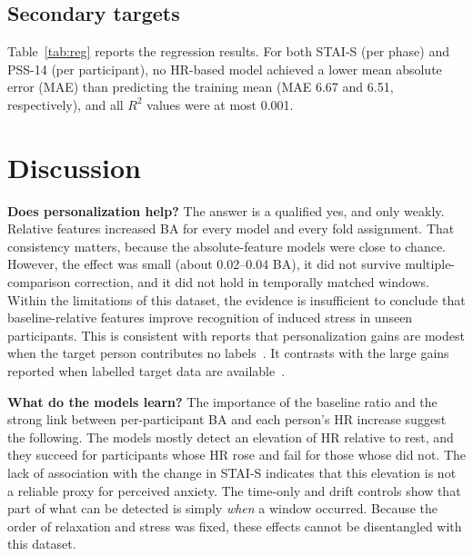 \documentclass[conference]{IEEEtran}
\begin{document}
\subsection{Secondary targets}
Table~\ref{tab:reg} reports the regression results. For both STAI-S (per phase) and PSS-14 (per participant), no HR-based model achieved a lower mean absolute error (MAE) than predicting the training mean (MAE 6.67 and 6.51, respectively), and all $R^2$ values were at most 0.001.

\begin{table}[t]
\caption{Secondary regression targets: MAE / $R^2$ under participant-wise CV. Sets A, B (=A+R) and C (=A+R+EDA+device ECG HR) are as defined in the accompanying application.}
\label{tab:reg}
\centering\footnotesize
\resizebox{\columnwidth}{!}{}
\end{table}

\section{Discussion}
\textbf{Does personalization help?} The answer is a qualified yes, and only weakly. Relative features increased BA for every model and every fold assignment. That consistency matters, because the absolute-feature models were close to chance. However, the effect was small (about 0.02--0.04 BA), it did not survive multiple-comparison correction, and it did not hold in temporally matched windows. Within the limitations of this dataset, the evidence is insufficient to conclude that baseline-relative features improve recognition of induced stress in unseen participants. This is consistent with reports that personalization gains are modest when the target person contributes no labels~\cite{tervonen2020som}. It contrasts with the large gains reported when labelled target data are available~\cite{nkurikiyeyezu2020person}.

\textbf{What do the models learn?} The importance of the baseline ratio and the strong link between per-participant BA and each person's HR increase suggest the following. The models mostly detect an elevation of HR relative to rest, and they succeed for participants whose HR rose and fail for those whose did not. The lack of association with the change in STAI-S indicates that this elevation is not a reliable proxy for perceived anxiety. The time-only and drift controls show that part of what can be detected is simply \emph{when} a window occurred. Because the order of relaxation and stress was fixed, these effects cannot be disentangled with this dataset.
\end{document}
